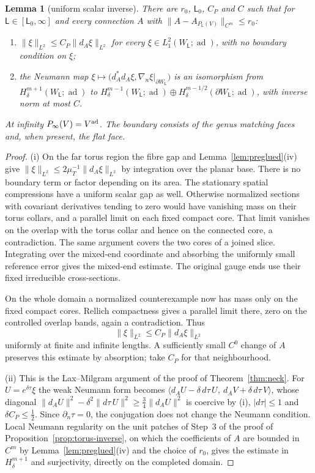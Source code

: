 \documentclass[11pt]{amsart}
\newtheorem{lemma}[theorem]{Lemma}
\theoremstyle{definition}
\theoremstyle{remark}
\theoremstyle{plain}
\numberwithin{equation}{section}
\newcommand{\ad}{\operatorname{ad}}
\begin{document}
\begin{lemma}[uniform scalar inverse]\label{lem:torus-scalar}
There are $r_0$, $\mathsf L_0$, $C_P$ and $C$ such that for
$\mathsf L\in[\mathsf L_0,\infty]$ and every connection $A$ with
$\|A-A_{P_\mathsf L(V)}\|_{C^m}\le r_0$:
\begin{enumerate}[label=(\roman*)]
\item $\|\xi\|_{L^2}\le C_P\|d_A\xi\|_{L^2}$ for every $\xi\in L^2_1(W_\mathsf L;\ad)$, with no
  boundary condition on $\xi$;
\item the Neumann map
$\xi\mapsto\bigl(d_A^*d_A\xi,\nabla_n\xi|_{\partial W_\mathsf L}\bigr)$
is an isomorphism from $H^{m+1}_\delta(W_\mathsf L;\ad)$ to
$H^{m-1}_\delta(W_\mathsf L;\ad)\oplus
 H^{m-1/2}_\delta(\partial W_\mathsf L;\ad)$, with inverse norm
at most $C$.
\end{enumerate}
At infinity $P_\infty(V)=V^{\rm ad}$. The boundary
consists of the genus matching faces and, when present, the flat face.
\end{lemma}

\begin{proof}
(i) On the far torus region the fibre gap and
Lemma~\ref{lem:preglued}(iv) give
$\|\xi\|_{L^2}\le 2\mu_T^{-1}\|d_A\xi\|_{L^2}$ by integration
over the planar base. There is no boundary term or factor depending
on its area. The stationary spatial compressions have a uniform
scalar gap as well. Otherwise normalized sections with covariant
derivatives tending to zero would have vanishing mass on their
torus collars, and a parallel limit on each fixed compact core.
That limit vanishes on the overlap with the torus collar and hence
on the connected core, a contradiction. The same argument covers
the two cores of a joined slice. Integrating over the mixed-end
coordinate and absorbing the uniformly small reference error gives
the mixed-end estimate. The original gauge ends use their fixed
irreducible cross-sections.

On the whole domain a normalized counterexample now has mass only
on the fixed compact cores. Rellich compactness gives a parallel
limit there, zero on the controlled overlap bands, again a
contradiction. Thus
\[
 \|\xi\|_{L^2}\le C_P\|d_A\xi\|_{L^2}
\]
uniformly at finite and infinite lengths. A sufficiently small
$C^0$ change of $A$ preserves this estimate by absorption; take
$C_P$ for that neighbourhood.

(ii) This is the Lax--Milgram argument of the proof of Theorem~\ref{thm:neck}. For
$U=e^{\delta\tau}\xi$ the weak Neumann form becomes
$\langle d_AU-\delta\,d\tau\,U,\ d_AV+\delta\,d\tau\,V\rangle$, whose diagonal
$\|d_AU\|^2-\delta^2\|d\tau\,U\|^2\ge\frac34\|d_AU\|^2$ is coercive by (i), $|d\tau|\le1$ and
$\delta C_P\le\frac12$. Since $\partial_n\tau=0$, the conjugation does not change the Neumann
condition. Local Neumann regularity on the unit patches of Step~3 of the proof of
Proposition~\ref{prop:torus-inverse}, on which the coefficients of $A$ are bounded in $C^m$ by
Lemma~\ref{lem:preglued}(iv) and the choice of $r_0$, gives the estimate in $H^{m+1}_\delta$ and
surjectivity, directly on the completed domain.
\end{proof}
\end{document}
